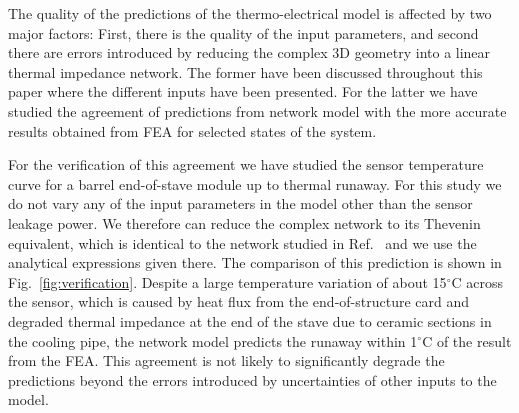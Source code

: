 The quality of the predictions of the thermo-electrical model is affected by two major factors: First, there is the quality of the input parameters, and second there are errors introduced by reducing the complex 3D geometry into a linear thermal impedance network. The former have been discussed throughout this paper where the different inputs have been presented. For the latter we have studied the agreement of predictions from network model with the more accurate results obtained from FEA for selected states of the system.

For the verification of this agreement we have studied the sensor temperature curve for a barrel end-of-stave module up to thermal runaway. For this study we do not vary any of the input parameters in the model other than the sensor leakage power. We therefore can reduce the complex network to its Thevenin equivalent, which is identical to the network studied in Ref.~\cite{Beck:2010zzd} and we use the analytical expressions given there. The comparison of this prediction is shown in Fig.~\ref{fig:verification}. Despite a large temperature variation of about 15$^\circ$C across the sensor, which is caused by heat flux from the end-of-structure card and degraded thermal impedance at the end of the stave due to ceramic sections in the cooling pipe, the network model predicts the runaway within 1$^\circ$C of the result from the FEA. This agreement is not likely to significantly degrade the predictions beyond the errors introduced by uncertainties of other inputs to the model. 

